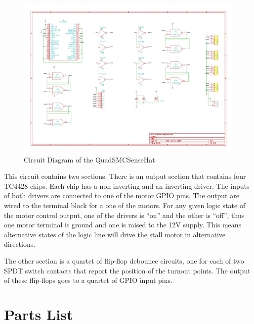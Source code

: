 \begin{figure}[hbpt]\begin{centering}%
\includegraphics[width=5in]{QuadSMCSenseHat.pdf}
\caption{Circuit Diagram of the QuadSMCSenseHat}
\end{centering}\end{figure}
This circuit contains two sections.  There is an output section that contains 
four TC4428 chips.  Each chip has a non-inverting and an inverting driver. The 
inputs of both drivers are connected to one of the motor GPIO pins.  The 
output are wired to the terminal block for a one of the motors. For any given 
logic state of the motor control output, one of the drivers is ``on'' and the 
other is ``off'', thus one motor terminal is ground and one is raised to the 
12V supply.  This means alternative states of the logic line will drive the 
stall motor in alternative directions.

The other section is a quartet of flip-flop debounce circuits, one for each
of two SPDT switch contacts that report the position of the turnout points.
The output of these flip-flops goes to a quartet of GPIO input pins.

\section{Parts List}


